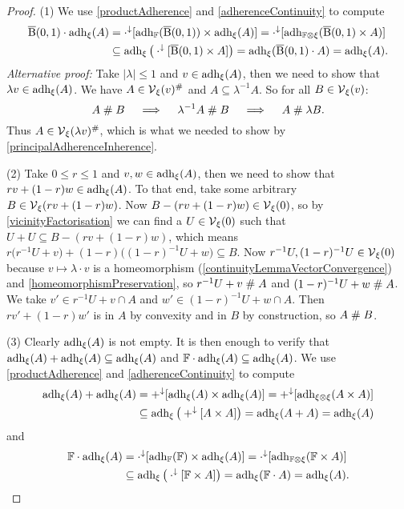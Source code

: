 \begin{proof}
(1) We use \ref{productAdherence} and \ref{adherenceContinuity} to compute
\begin{align*}
\operatorname{\overline{B}}(0,1)\cdot \operatorname{adh}_\xi(A) &= \cdot^\downarrow[\operatorname{adh}_{\mathbb{F}}(\operatorname{\overline{B}}(0,1))\times \operatorname{adh}_\xi(A)] = \cdot^\downarrow[\operatorname{adh}_{\mathbb{F}\otimes \xi}(\operatorname{\overline{B}}(0,1)\times A)] \\
&\subseteq \operatorname{adh}_{\xi}\big(\cdot^\downarrow[\operatorname{\overline{B}}(0,1)\times A]\big) = \operatorname{adh}_{\xi}(\operatorname{\overline{B}}(0,1)\cdot A) = \operatorname{adh}_\xi(A).
\end{align*}
\textit{Alternative proof:}
Take $|\lambda|\leq 1$ and $v\in \operatorname{adh}_\xi(A)$, then we need to show that $\lambda v \in \operatorname{adh}_\xi(A)$. We have $A\in \operatorname{\mathcal{V}}_\xi(v)^{\mathrel{\#}}$ and $A\subseteq \lambda^{-1}A$. So for all $B\in \operatorname{\mathcal{V}}_\xi(v)$:
\[ A\mathrel{\#} B \quad\implies\quad \lambda^{-1}A\mathrel{\#} B \quad\implies\quad A\mathrel{\#} \lambda B. \]
Thus $A\in \operatorname{\mathcal{V}}_\xi(\lambda v)^{\mathrel{\#}}$, which is what we needed to show by \ref{principalAdherenceInherence}.

(2) Take $0\leq r \leq 1$ and $v,w\in \operatorname{adh}_\xi(A)$, then we need to show that $rv + (1-r)w \in \operatorname{adh}_\xi(A)$. To that end, take some arbitrary $B\in \operatorname{\mathcal{V}}_\xi(rv+(1-r)w)$. Now $B - (rv+(1-r)w) \in \operatorname{\mathcal{V}}_\xi(0)$, so by \ref{vicinityFactorisation} we can find a $U\in\operatorname{\mathcal{V}}_\xi(0)$ such that $U+U \subseteq B - (rv+(1-r)w)$, which means $r\big(r^{-1}U + v\big) + (1-r)\big((1-r)^{-1}U + w\big) \subseteq B$. Now $r^{-1}U, (1-r)^{-1}U\in \operatorname{\mathcal{V}}_\xi(0)$ because $v\mapsto\lambda\cdot v$ is a homeomorphism (\ref{continuityLemmaVectorConvergence}) and \ref{homeomorphismPreservation}, so $r^{-1}U + v \mathrel{\#} A$ and $(1-r)^{-1}U + w \mathrel{\#} A$. We take $v'\in r^{-1}U + v \cap A$ and $w'\in (1-r)^{-1}U + w \cap A$. Then $rv'+(1-r)w'$ is in $A$ by convexity and in $B$ by construction, so $A\mathrel{\#} B$.

(3) Clearly $\operatorname{adh}_\xi(A)$ is not empty. It is then enough to verify that $\operatorname{adh}_\xi(A)+\operatorname{adh}_\xi(A)\subseteq \operatorname{adh}_\xi(A)$ and $\mathbb{F}\cdot \operatorname{adh}_\xi(A) \subseteq \operatorname{adh}_\xi(A)$. We use \ref{productAdherence} and \ref{adherenceContinuity} to compute
\begin{align*}
\operatorname{adh}_\xi(A) + \operatorname{adh}_\xi(A) &= +^\downarrow[\operatorname{adh}_\xi(A)\times \operatorname{adh}_\xi(A)] = +^\downarrow[\operatorname{adh}_{\xi\otimes \xi}(A\times A)] \\
&\subseteq \operatorname{adh}_{\xi}\big(+^\downarrow[A\times A]\big) = \operatorname{adh}_{\xi}(A + A) = \operatorname{adh}_\xi(A)
\end{align*}
and
\begin{align*}
\mathbb{F}\cdot \operatorname{adh}_\xi(A) &= \cdot^\downarrow[\operatorname{adh}_{\mathbb{F}}(\mathbb{F})\times \operatorname{adh}_\xi(A)] = \cdot^\downarrow[\operatorname{adh}_{\mathbb{F}\otimes \xi}(\mathbb{F}\times A)] \\
&\subseteq \operatorname{adh}_{\xi}\big(\cdot^\downarrow[\mathbb{F}\times A]\big) = \operatorname{adh}_{\xi}(\mathbb{F}\cdot A) = \operatorname{adh}_\xi(A).
\end{align*}
\end{proof}
